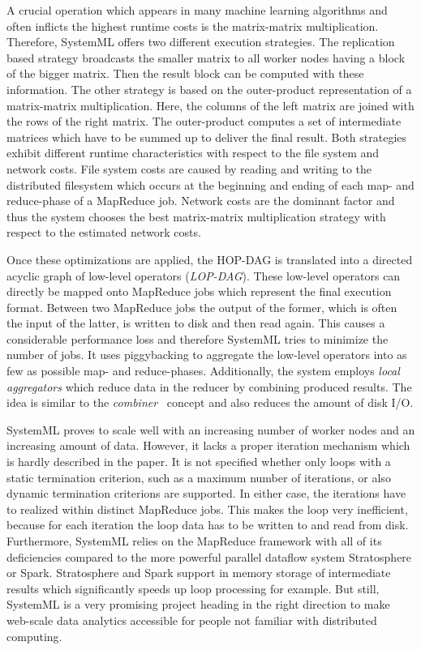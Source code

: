 A crucial operation which appears in many machine learning algorithms and often inflicts the highest runtime costs is the matrix-matrix multiplication.
Therefore, SystemML offers two different execution strategies.
The replication based strategy broadcasts the smaller matrix to all worker nodes having a block of the bigger matrix.
Then the result block can be computed with these information.
The other strategy is based on the outer-product representation of a matrix-matrix multiplication.
Here, the columns of the left matrix are joined with the rows of the right matrix.
The outer-product computes a set of intermediate matrices which have to be summed up to deliver the final result.
Both strategies exhibit different runtime characteristics with respect to the file system and network costs.
File system costs are caused by reading and writing to the distributed filesystem which occurs at the beginning and ending of each map- and reduce-phase of a MapReduce job.
Network costs are the dominant factor and thus the system chooses the best matrix-matrix multiplication strategy with respect to the estimated network costs.

Once these optimizations are applied, the HOP-DAG is translated into a directed acyclic graph of low-level operators (\emph{LOP-DAG}).
These low-level operators can directly be mapped onto MapReduce jobs which represent the final execution format.
Between two MapReduce jobs the output of the former, which is often the input of the latter, is written to disk and then read again.
This causes a considerable performance loss and therefore SystemML tries to minimize the number of jobs.
It uses piggybacking to aggregate the low-level operators into as few as possible map- and reduce-phases.
Additionally, the system employs \emph{local aggregators} which reduce data in the reducer by combining produced results.
The idea is similar to the \emph{combiner}~\cite{dean:c2008a} concept and also reduces the amount of disk I/O.

SystemML proves to scale well with an increasing number of worker nodes and an increasing amount of data.
However, it lacks a proper iteration mechanism which is hardly described in the paper.
It is not specified whether only loops with a static termination criterion, such as a maximum number of iterations, or also dynamic termination criterions are supported.
In either case, the iterations have to realized within distinct MapReduce jobs.
This makes the loop very inefficient, because for each iteration the loop data has to be written to and read from disk.
Furthermore, SystemML relies on the MapReduce framework with all of its deficiencies compared to the more powerful parallel dataflow system Stratosphere or Spark.
Stratosphere and Spark support in memory storage of intermediate results which significantly speeds up loop processing for example.
But still, SystemML is a very promising project heading in the right direction to make web-scale data analytics accessible for people not familiar with distributed computing.

